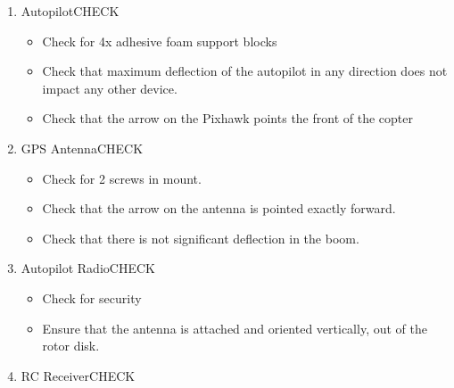 \documentclass{report}
\begin{document}
\begin{enumerate}
\begin{enumerate}
\begin{enumerate}
\begin{itemize}
									\item Check for cracks, excess abrasion
								\end{itemize}
							\item 2x Battery Boom\hrulefill CHECK
								\begin{itemize}
									\item Check for proper interfacing with 2x grommets on clamps
									\item Check for cracks, nicks, flexing, and other defects
								\end{itemize}
							\item 2x Battery Straps\hrulefill CHECK
								\begin{itemize}
									\item Check for presence
									\item Check for 40 cm length
								\end{itemize}
						\end{enumerate}
				\end{enumerate}
			\item Autopilot\hrulefill CHECK
				\begin{itemize}
					\item Check for 4x adhesive foam support blocks
					\item Check that maximum deflection of the autopilot in any direction does not impact any other device.
					\item Check that the arrow on the Pixhawk points the front of the copter
				\end{itemize}
			\item GPS Antenna\hrulefill CHECK
				\begin{itemize}
					\item Check for 2 screws in mount.
					\item Check that the arrow on the antenna is pointed exactly forward.
					\item Check that there is not significant deflection in the boom.
				\end{itemize}
			\item Autopilot Radio\hrulefill CHECK
				\begin{itemize}
					\item Check for security
					\item Ensure that the antenna is attached and oriented vertically, out of the rotor disk.
				\end{itemize}
			\item RC Receiver\hrulefill CHECK

\end{enumerate}
\end{document}
